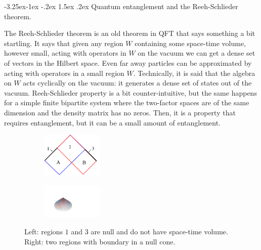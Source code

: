 \documentclass[11pt]{article}
\makeatletter
\renewcommand\subsection{\@startsection{subsection}{2}{\z@}%
                                   {-3.25ex\@plus -1ex \@minus -.2ex}%
                                     {1.5ex \@plus .2ex}%
                                     {\normalfont\bfseries}}
\numberwithin{equation}{section}
\makeatother
\begin{document}
\subsection{Quantum entanglement and the Reeh-Schlieder theorem.}

The Reeh-Schlieder theorem is an old theorem in QFT that says something a bit startling. It says that given any region $W$ containing some space-time volume, however small, acting with operators in $W$ on the vacuum we can get a dense set of vectors in the Hilbert space. Even far away particles can be approximated by acting with operators in a small region $W$. Technically, it is said that the algebra on $W$ acts cyclically on the vacuum: it generates a dense set of states out of the vacuum. Reeh-Schlieder property is a bit counter-intuitive, but the same happens for a simple finite bipartite system where the two-factor spaces are of the same dimension and the density matrix has no zeros. Then, it is a property that requires entanglement, but it can be a small amount of entanglement.   

\begin{figure}[t]  
\begin{subfigure}
\centering
\hspace{1.3cm}\includegraphics[width=0.32\textwidth]{segmento.png}
\end{subfigure}
\hspace{2cm}
\begin{subfigure}
\centering
\includegraphics[width=0.32\textwidth]{enelcono.pdf}
\end{subfigure}
\captionsetup{width=0.9\textwidth}
\caption{Left: regions $1$ and $3$ are null and do not have space-time volume. Right: two regions with boundary in a null cone. }
\label{cono1}
\end{figure}  
\end{document}
